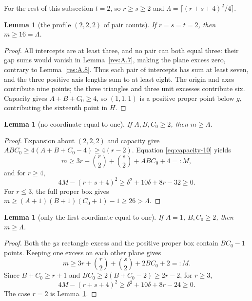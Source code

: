 \documentclass[11pt]{article}
\newtheorem{lemma}[theorem]{Lemma}
\theoremstyle{definition}
\theoremstyle{remark}
\theoremstyle{plain}
\begin{document}
For the rest of this subsection $t=2$, so $r\ge s\ge2$ and
$\Lambda=\lceil(r+s+4)^2/4\rceil$.

\begin{lemma}[the profile $(2,2,2)$ of pair counts]\label{res:A12.2}
If $r=s=t=2$, then $m\ge16=\Lambda$.
\end{lemma}
\begin{proof}
All intercepts are at least three, and no pair can both equal three:
their gap sums would vanish in Lemma~\ref{res:A.7}, making the plane excess zero,
contrary to Lemma~\ref{res:A.8}.  Thus each pair of intercepts has sum at least seven,
and the three positive axis lengths sum to at least eight.
The origin and axes contribute nine points; the three triangles and
three unit excesses contribute six.  Capacity gives
$A+B+C_0\ge4$, so $(1,1,1)$ is a positive proper point below $g$,
contributing the sixteenth point in $H$. \end{proof}

\begin{lemma}[no coordinate equal to one]\label{res:A12.3}
If $A,B,C_0\ge2$, then $m\ge \Lambda$.
\end{lemma}
\begin{proof}
Expansion about $(2,2,2)$ and capacity give
$ABC_0\ge4(A+B+C_0-4)\ge4(r-2)$.
Equation \eqref{eq:capacity-10} yields
\[
 m\ge3r+\binom r2+\binom s2+ABC_0+4=:M,
\]
and for $r\ge4$,
\[
 4M-(r+s+4)^2\ge\delta^2+10\delta+8r-32\ge0.
\]
For $r\le3$, the full proper box gives
$m\ge(A+1)(B+1)(C_0+1)-1\ge26>\Lambda$.
\end{proof}

\begin{lemma}[only the first coordinate equal to one]\label{res:A12.4}
If $A=1$, $B,C_0\ge2$, then $m\ge \Lambda$.
\end{lemma}
\begin{proof}
Both the $yz$ rectangle excess and the positive proper box contain
$BC_0-1$ points.  Keeping one excess on each other plane gives
\[
 m\ge3r+\binom r2+\binom s2+2BC_0+2=:M.
\]
Since $B+C_0\ge r+1$ and
$BC_0\ge2(B+C_0-2)\ge2r-2$, for $r\ge3$,
\[
 4M-(r+s+4)^2\ge\delta^2+10\delta+8r-24\ge0.
\]
The case $r=2$ is Lemma~\ref{res:A12.2}. \end{proof}
\end{document}
